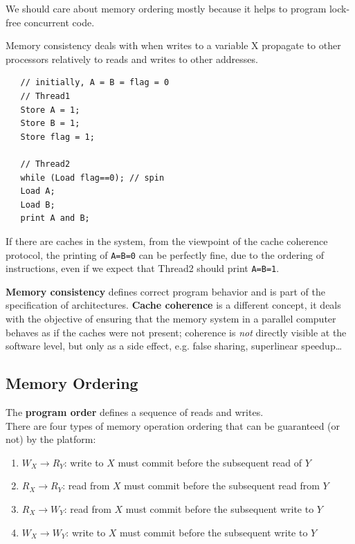 We should care about memory ordering mostly because it helps to program lock-free concurrent code.

Memory consistency deals with when writes to a variable X propagate to other processors relatively to reads and writes to other addresses.

\begin{lstlisting}
   // initially, A = B = flag = 0
   // Thread1 
   Store A = 1;
   Store B = 1;
   Store flag = 1;
   
   // Thread2
   while (Load flag==0); // spin
   Load A;
   Load B;
   print A and B;
\end{lstlisting}

If there are caches in the system, from the viewpoint of the cache coherence protocol, the printing of \lstinline|A=B=0| can be perfectly fine, due to the ordering of instructions, even if we expect that Thread2 should print \lstinline|A=B=1|.

\textbf{Memory consistency} defines correct program behavior and is part of the specification of architectures.
\textbf{Cache coherence} is a different concept, it deals with the objective of ensuring that the memory
system in a parallel computer behaves as if the caches were not present; coherence is \textit{not} directly visible at the software level, but only as a side effect, e.g. false sharing, superlinear speedup\dots

\subsection{Memory Ordering}
The \textbf{program order} defines a sequence of reads and writes.\\
There are four types of memory operation ordering that can be guaranteed (or not) by the platform:
\begin{enumerate}
   \item $W_X \rightarrow R_Y$: write to $X$ must commit before the subsequent read of $Y$
	\item $R_X \rightarrow R_Y$: read from $X$ must commit before the subsequent read from $Y$
	\item $R_X \rightarrow W_Y$: read from $X$ must commit before the subsequent write to $Y$
	\item $W_X \rightarrow W_Y$: write to $X$ must commit before the subsequent write to $Y$
\end{enumerate}

